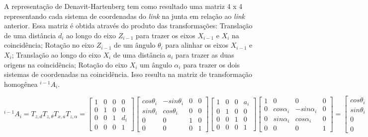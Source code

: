 A representação de Denavit-Hartenberg tem como resultado uma matriz 4 x 4 representando cada sistema de coordenadas do \textit{link} na junta em relação ao \textit{link} anterior. Essa matriz é obtida através do produto das transformações: Translação de uma distância $d_{i}$ ao longo do eixo $Z_{i-1}$ para trazer os eixos $X_{i-1}$ e $X_{i}$ na coincidência; Rotação no eixo $Z_{i-1}$ de um ângulo $\theta_{i}$ para alinhar os eixos $X_{i-1}$ e $X_{i}$; Translação ao longo do eixo $X_{i}$ de uma distância $a_{i}$ para trazer as duas origens na coincidência; Rotação do eixo $X_{i}$ um ângulo $\alpha_{i}$ para trazer os dois sistemas de coordenadas na coincidência. Isso resulta na matriz de transformação homogênea $^{i-1}A_{i}$.

\begin{equation}^{i-1}A_{i}=T_{z,d} T_{z,\theta} T_{x,a} T_{z,\alpha}=\begin{bmatrix}
1 & 0 & 0 & 0\\ 
0 & 1 & 0 & 0\\ 
0 & 0 & 1 & d_{i}\\ 
0 & 0 & 0 & 1
\end{bmatrix}\begin{bmatrix}
cos\theta_{i} & -sin\theta_{i} & 0 & 0\\ 
sin\theta_{i} & cos\theta_{i} & 0 & 0\\ 
0 & 0 & 1 & 0\\ 
0 & 0 & 0 & 1
\end{bmatrix}\begin{bmatrix}
1 & 0 & 0 & a_{i}\\ 
0 & 1 & 0 & 0\\ 
0 & 0 & 1 & 0\\ 
0 & 0 & 0 & 1
\end{bmatrix}\begin{bmatrix}
1 & 0 & 0 & 0\\ 
0 & cos\alpha_{i} & -sin\alpha_{i} & 0\\ 
0 & sin\alpha_{i} & cos\alpha_{i} & 0\\ 
0 & 0 & 0 & 1
\end{bmatrix}=\begin{bmatrix}
cos\theta_{i} & -cos\alpha_{i}sin\alpha_{i} & sen\alpha_{i}sin\theta_{i} & a_{i}cos\theta_{i}\\ 
sin\theta_{i} & cos\alpha_{i}cos\theta_{i} & -sin\alpha_{i}cos\theta_{i} & a_{i}sin\theta_{i}\\ 
0 & sin\alpha_{i} & cos\alpha_{i} & d_{i}\\ 
0 & 0 & 0 & 1
\end{bmatrix}\end{equation}

